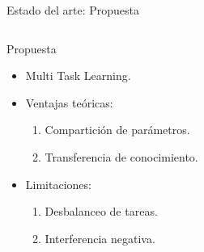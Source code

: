 \documentclass[xcolor=dvipsnames,table]{beamer}
\begin{document}
\begin{frame}{Estado del arte: Propuesta}
	\begin{columns}[c]
		\begin{block}{Propuesta}
			\begin{itemize}
				\item Multi Task Learning.
				\item Ventajas teóricas:
				\begin{enumerate}
					\item Compartición de parámetros.
					\item Transferencia de conocimiento.
				\end{enumerate}
				\item Limitaciones:
				\begin{enumerate}
					\item Desbalanceo de tareas.
					\item Interferencia negativa.
				\end{enumerate}
			\end{itemize}
		\end{block}
		

\end{columns}
\end{frame}
\end{document}
